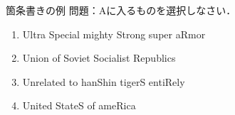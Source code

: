 \begin{frame}{箇条書きの例}
    問題：Aに入るものを選択しなさい．

    \begin{enumerate}
        \item Ultra Special mighty Strong super aRmor
        \item Union of Soviet Socialist Republics
        \item Unrelated to hanShin tigerS entiRely
        \item United StateS of ameRica
    \end{enumerate}
\end{frame}
